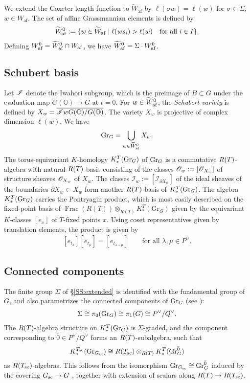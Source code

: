\documentclass[a4paper]{amsart}
\theoremstyle{remark}
\numberwithin{equation}{section}
\begin{document}
{We extend the Coxeter length function to \(\widetilde W_{\mathrm{af}}\) by \(\ell(\sigma w)=\ell(w)\) for \(\sigma\in\Sigma\), \(w\in W_{\mathrm{af}}\).}
The set of affine Grassmannian elements is defined by
\[
\widetilde{W}_{\mathrm{af}}^0:=\{w\in \widetilde{W}_{\mathrm{af}}\mid \ell(ws_i)>\ell(w)\quad
\text{for all $i\in I$}\}.
\]
Defining $W_{\mathrm{af}}^0=\widetilde{W}_{\mathrm{af}}^0\cap W_{\mathrm{af}}$, we have 
$\widetilde{W}_{\mathrm{af}}^0=\Sigma\cdot  W_{\mathrm{af}}^0$.

\subsection{Schubert basis}
\label{SS:Schubert basis}
Let $\mathscr{I}$ denote the Iwahori subgroup, which is the 
preimage of $B\subset G$ under the evaluation map
$G(\mathbb{O})\rightarrow G$ at $t=0.$
For $w\in \widetilde{W}_{\mathrm{af}}^0$, the \emph{Schubert variety} is defined by
$X_w=\overline{\mathscr{I} w G(\mathbb{O})/G(\mathbb{O})}$.
The variety $X_w$ is projective of complex dimension $\ell(w)$.
We have $$\mathrm{Gr}_G=\bigcup_{w\in \widetilde{W}_{\mathrm{af}}^0} X_w.$$  
{
The torus-equivariant $K$-homology $K_*^T(\mathrm{Gr}_G)$ of $\mathrm{Gr}_G$ is a commutative $R(T)$-algebra with natural $R(T)$-basis consisting of 
 the classes $\mathscr{O}_{w}:=[\mathscr{O}_{X_w}]$ of structure
sheaves $\mathscr{O}_{X_w}$ of $X_w$. 
The classes
$
\mathscr{I}_w:=[\mathscr{I}_{\partial X_w}]
$
of the ideal sheaves of the boundaries $\partial X_w\subset X_w$ form another $R(T)$-basis of $K_*^T(\mathrm{Gr}_G)$. The algebra $K_*^T(\mathrm{Gr}_G)$ carries the Pontryagin product, which is most easily described on 
the fixed-point basis 
of \(\operatorname{Frac}(R(T))\otimes_{R(T)}K_*^T(\mathrm{Gr}_G)\)%
 given by the equivariant $K$-classes $[e_x]$ of 
$T$-fixed points $x$. Using coset representatives given by translation elements, the product is given by
\begin{align}\label{E:pontryagin}
[e_{t_\lambda}] [e_{t_\mu}] = [e_{t_{\lambda+\mu}}] \qquad\text{for all $\lambda,\mu\in P^\vee$.}
\end{align}
}


\subsection{Connected components}
\label{SS:components}
{The finite group $\Sigma$ of \S \ref{SS:extended} is identified with the fundamental group of $G$, and also parametrizes the connected components of $\mathrm{Gr}_G$ (see \cite[Theorem 1.3.11 (1)]{Zhu}):
\begin{equation}
\Sigma\cong
\pi_0(\mathrm{Gr}_{G})
\cong
\pi_1(G)
\cong
P^\lor/Q^\lor.
\end{equation}
The $R(T)$-algebra structure on $K_*^T(\mathrm{Gr}_G)$ 
is $\Sigma$-graded, 
and the component corresponding to $\bar{0}\in P^\lor/Q^\lor$
forms an $R(T)$-subalgebra, such that
\begin{equation}
\label{eq:K_Gr_Ts}
K_{*}^{T_{\mathrm{sc}}}(\mathrm{Gr}_{G_{\mathrm{sc}}})\cong
R(T_{\mathrm{sc}})
\otimes_{R(T)}K_*^{T}(\mathrm{Gr}_G^{\bar{0}})    
\end{equation}
as $R(T_{\mathrm{sc}})$-algebras.
This follows from the isomorphism
$\mathrm{Gr}_{G_{\mathrm{sc}}}\cong\mathrm{Gr}_G^{\bar{0}}$
induced by the covering $G_{\mathrm{sc}}\to G$
\cite[Theorem~1.3.11(3)]{Zhu},
together with extension of scalars along $R(T)\to R(T_{\mathrm{sc}})$.}
\end{document}

